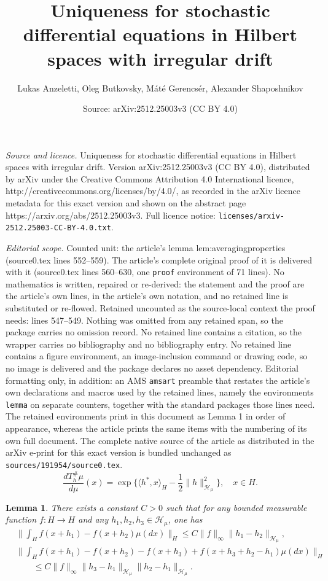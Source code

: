 \documentclass[10pt,a4paper]{amsart}
\title{Uniqueness for stochastic differential equations in Hilbert spaces with irregular drift}
\author{Lukas Anzeletti, Oleg Butkovsky, M\'at\'e Gerencs\'er, Alexander Shaposhnikov}
\date{Source: arXiv:2512.25003v3 (CC BY 4.0)}
\newtheorem{lemma}{Lemma}
\newcommand{\CM}{\H_\mu}
\renewcommand{\H}{\mathcal{H}}
\renewcommand{\le}{\leqslant}
\begin{document}
\maketitle

\noindent\emph{Source and licence.} Uniqueness for stochastic differential equations in Hilbert spaces with irregular drift. Version arXiv:2512.25003v3 (CC BY 4.0), distributed by arXiv under the Creative Commons Attribution 4.0 International licence, http://creativecommons.org/licenses/by/4.0/, as recorded in the arXiv licence metadata for this exact version and shown on the abstract page https://arxiv.org/abs/2512.25003v3. Full licence notice: \texttt{licenses/arxiv-2512.25003-CC-BY-4.0.txt}.\par\smallskip

\noindent\textit{Editorial scope.} Counted unit: the article's lemma lem:averagingproperties (source0.tex lines 552--559). The article's complete original proof of it is delivered with it (source0.tex lines 560--630, one \texttt{proof} environment of 71 lines). No mathematics is written, repaired or re-derived: the statement and the proof are the article's own lines, in the article's own notation, and no retained line is substituted or re-flowed.  Retained uncounted as the source-local context the proof needs: lines 547--549.  Nothing was omitted from any retained span, so the package carries no omission record.  No retained line contains a citation, so the wrapper carries no bibliography and no bibliography entry.  No retained line contains a figure environment, an image-inclusion command or drawing code, so no image is delivered and the package declares no asset dependency.  Editorial formatting only, in addition: an AMS \texttt{amsart} preamble that restates the article's own declarations and macros used by the retained lines, namely the environments \texttt{lemma} on separate counters, together with the standard packages those lines need.  The retained environments print in this document as Lemma 1 in order of appearance, whereas the article prints the same items with the numbering of its own full document.  The complete native source of the article as distributed in the arXiv e-print for this exact version is bundled unchanged as \texttt{sources/191954/source0.tex}.
\begin{equation}\label{eq:R-N}
\frac{d T_h^\# \mu}{d \mu}(x)=\exp\Big\{\langle h^*,x\rangle_H-\frac{1}{2}\|h\|_{\CM}^2\Big\},\quad x\in H.
\end{equation}

\begin{lemma} \label{lem:averagingproperties}
There exists a constant $C>0$ such that for any bounded measurable function $f\colon H\to H$ and any $h_1,h_2,h_3 \in \mathcal{H}_{\mu}$, one has
\begin{align}
&\Big\|\int_H f(x+h_1)-f(x+h_2) \mu(dx)\Big\|_{H}\leqslant C\|f\|_\infty \|h_1-h_2\|_{\CM} \label{eq:2point},\\
&\Big\|\int_H f(x+h_1)-f(x+h_2)-f(x+h_3)+f(x+h_3+h_2-h_1) \mu(dx)\Big\|_{H} \nonumber\\
    &\qquad\le C \|f\|_\infty \|h_3-h_1\|_{\CM} \|h_2-h_1\|_{\CM}. \label{eq:4point}
\end{align}
\end{lemma}
\end{document}
